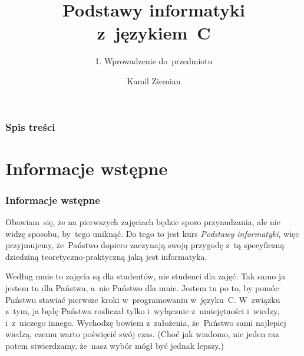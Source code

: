 \documentclass[10pt,t]{beamer}
\title{Podstawy informatyki z~językiem~C}
\subtitle{1. Wprowadzenie do~przedmiotu}
\author{Kamil Ziemian \\
  \email}
\begin{document}





\RaggedRight





\maketitle





\begin{frame}
  \frametitle{Spis treści}


  \tableofcontents

\end{frame}





\section{Informacje wstępne}



\begin{frame}
  \frametitle{Informacje wstępne}


  Obawiam~się, że na pierwszych zajęciach będzie sporo przynudzania,
  ale nie widzę sposobu, by~tego uniknąć. Do tego to jest kurs
  \textit{Podstawy informatyki}, więc przyjmujemy, że~Państwo dopiero
  zaczynają swoją przygodę z~tą specyficzną dziedziną
  teoretyczno-praktyczną jaką jest informatyka.

  Według mnie to zajęcia są dla studentów, nie studenci dla zajęć. Tak samo
  ja jestem tu dla Państwa, a~nie Państwo dla mnie. Jestem tu po to, by
  pomóc Państwu stawiać pierwsze kroki w~programowaniu w~języku~C.
  W~związku z~tym, ja będę Państwa rozliczał tylko i~wyłącznie
  z~umiejętności i~wiedzy, i~z~niczego innego. Wychodzę bowiem z~założenia,
  że~Państwo sami najlepiej wiedzą, czemu warto poświęcić swój czas. (Choć
  jak wiadomo, nie jeden raz potem stwierdzamy, że~nasz wybór mógł być
  jednak lepszy.)

\end{frame}
\end{document}
